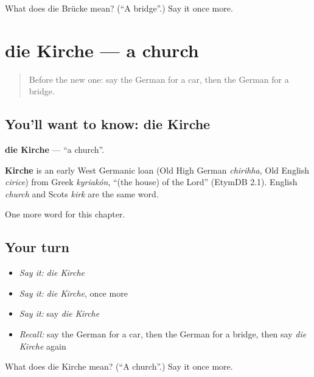\begin{tcolorbox}[breakable,colback=teal!4,colframe=teal!35!black,title={Before you move on}]
What does die Brücke mean? (\textquotedblleft{}A bridge\textquotedblright{}.) Say it once more.
\end{tcolorbox}
\section[die Kirche]{die Kirche — a church}

\label{lesson:GE-C97-kirche}



\begin{quote}
Before the new one: say the German for a car, then the German for a bridge.
\end{quote}

\subsection*{You'll want to know: die Kirche}
\textbf{die Kirche} — \textquotedblleft{}a church\textquotedblright{}.

\begin{cousinweb}
\textbf{Kirche} is an early West Germanic loan (Old High German \emph{chirihha}, Old English \emph{cirice}) from Greek \emph{kyriakón}, \textquotedblleft{}(the house) of the Lord\textquotedblright{} (EtymDB 2.1). English \emph{church} and Scots \emph{kirk} are the same word.
\end{cousinweb}

\begin{grammarlens}[title={What you've built}]
One more word for this chapter.
\end{grammarlens}

\subsection*{Your turn}
\begin{itemize}
\raggedright
  \item \emph{Say it:} \emph{die Kirche}
  \item \emph{Say it:} \emph{die Kirche}, once more
  \item \emph{Say it:} say \emph{die Kirche}
  \item \emph{Recall:} say the German for a car, then the German for a bridge, then say \emph{die Kirche} again
\end{itemize}

\begin{tcolorbox}[breakable,colback=teal!4,colframe=teal!35!black,title={Before you move on}]
What does die Kirche mean? (\textquotedblleft{}A church\textquotedblright{}.) Say it once more.
\end{tcolorbox}
